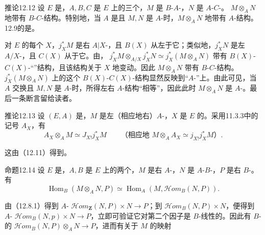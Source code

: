 \begin{SGAresult}{推论}{12.12}
设 $E$ 是，$A,B,C$ 是 $E$ 上的三个，$M$ 是 $B$-$A$-，$N$ 是 $A$-$C$-。 $M\otimes_A N$ 地带有 $B$-$C$-结构。特别地，当 $A$ 是且 $M,N$ 是 $A$-时，$M\otimes_A N$ 地带有 $A$-结构。12.9的是。
\end{SGAresult}
对 $E$ 的每个 $X$，$j_X^*M$ 是右 $A|X$-，且 $B(X)$ 从左于它；类似地，$j_X^*N$ 是左 $A/X$-，且 $C(X)$ 从于它。由， $j_X^*M\otimes_{A/X}j_X^*N\simeq j_X^*(M\otimes_A N)$ 带有 $B(X)$-$C(X)$-“”结构，且该结构关于 $X$ 地变动。因此 $M\otimes_A N$ 带有 $B$-$C$-结构。$j_X^*(M\otimes_A N)$ 上的这个 $B(X)$-$C(X)$-结构显然反映到“$A$-”上。由此可见，当 $A$ 交换且 $M,N$ 是 $A$-时，所得左右 $A$-结构“相等”，因此此时 $M\otimes_A N$ 是 $A$-。最后一条断言留给读者。
\begin{SGAresult}{推论}{12.13}
设 $(E,A)$ 是，$M$ 是左（相应地右）$A$-，$X$ 是 $E$ 的。采用11.3.3中的记号 $A_X$，有
\[A_X\otimes_A M\simeq J_{X!}j_X^*M\qquad\text{（相应地 }M\otimes_A A_X\simeq j_{X!}j_X^*M\text{）}.\]
\end{SGAresult}
这由（12.11）得到。
\begin{SGAresult}{命题}{12.14}
设 $E$ 是，$A,B$ 是 $E$ 上的两个，$M$ 是右 $A$-，$N$ 是 $A$-$B$-，$P$ 是右 $B$-。有
\[\operatorname{Hom}_B(M\otimes_A N,P)\simeq\operatorname{Hom}_A(M,\mathscr{H}\!om_B(N,P)).\]
\end{SGAresult}
由（12.8.1）得到 $A$- $\mathscr{H}\!om_{\mathbf Z}(N,P)\times N\to P$；到 $\mathscr{H}\!om_B(N,P)\times N$，便得到 $A$- $\mathscr{H}\!om_B(N,p)\times N\to P$，立即可验证它对第二个因子是 $B$-线性的。因此有 $B$-的 $\mathscr{H}\!om_B(N,P)\otimes_A N\to P$，进而有关于 $M$ 的映射
